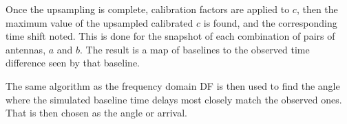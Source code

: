 Once the upsampling is complete, calibration factors are applied to \(c\), then the maximum value of the upsampled calibrated \(c\) is found, and the corresponding time shift noted. This is done for the snapshot of each combination of pairs of antennas, \(a\) and \(b\). The result is a map of baselines to the observed time difference seen by that baseline.

The same algorithm as the frequency domain DF is then used to find the angle where the simulated baseline time delays most closely match the observed ones. That is then chosen as the angle or arrival.



